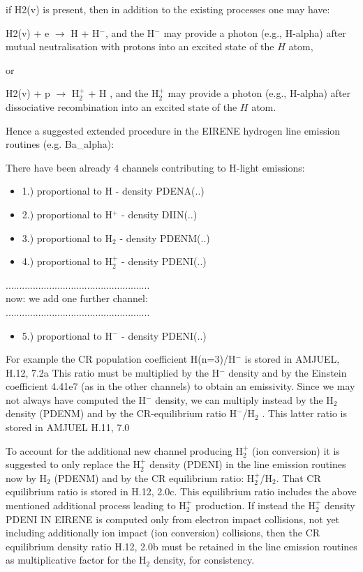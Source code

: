 \documentclass[12pt,dvipdfmx]{article}
\begin{document}
\begin{itemize}
if H2(v) is present, then in addition to the existing processes
one may have:

H2(v) + e $\rightarrow$ H + H$^-$, and the H$^-$ may provide a photon (e.g., H-alpha)
after mutual neutralisation
with protons into an excited state of the $H$ atom,

or

H2(v) + p $\rightarrow$ H$_2^+$  + H , and the H$_2^+$ may provide a photon (e.g., H-alpha)
after dissociative recombination into an excited state of the $H$ atom.



Hence a suggested extended procedure in the EIRENE hydrogen line emission routines
(e.g. Ba\_alpha):

There have been already 4 channels contributing to H-light emissions:
\begin{itemize}
\item
1.) proportional to H - density PDENA(..)
\item
2.) proportional to H$^+$ - density DIIN(..)
\item
3.) proportional to H$_2$ - density PDENM(..)
\item
4.) proportional to H$_2^+$ - density PDENI(..)
\end{itemize}
.....................................................\\
now: we add one further channel:\\
.....................................................\\
\begin{itemize}
\item
5.) proportional to H$^-$ - density PDENI(..)
\end{itemize}
For example the CR population coefficient H(n=3)/H$^-$ is stored in AMJUEL, H.12, 7.2a
This ratio must be multiplied by the H$^-$ density and by the Einstein coefficient 4.41e7
(as in the other channels) to obtain an emissivity.
Since we may not always have computed the H$^-$ density, we can multiply instead by the H$_2$ density
(PDENM) and by the CR-equilibrium ratio H$^-$/H$_2$ . This latter ratio is stored in AMJUEL H.11, 7.0

To account for the additional new channel producing H$_2^+$ (ion conversion)
it is suggested to only replace the
H$_2^+$ density (PDENI) in the line emission routines now by H$_2$ (PDENM) and by the
CR equilibrium ratio: H$_2^+$/H$_2$.
That CR equilibrium ratio is stored in H.12, 2.0c.
This equilibrium ratio includes the above mentioned additional
process leading to H$_2^+$ production.
If instead the H$_2^+$ density PDENI IN EIRENE
is computed only from electron impact collisions, not
yet including additionally ion impact (ion conversion) collisions, then the CR equilibrium density ratio H.12, 2.0b
must be retained in the line emission routines as multiplicative factor for the H$_2$ density, for consistency.


\end{itemize}
\end{document}
